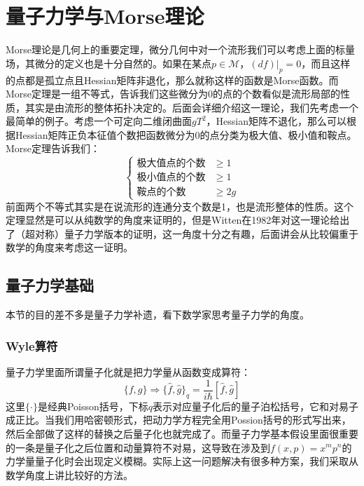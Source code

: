 \chapter{量子力学与Morse理论}
Morse理论是几何上的重要定理，微分几何中对一个流形我们可以考虑上面的标量场，其微分的定义也是十分自然的。如果在某点$p\in\mathcal{M}$，$(df)|_p=0$，而且这样的点都是孤立点且Hessian矩阵非退化，那么就称这样的函数是Morse函数。而Morse定理是一组不等式，告诉我们这些微分为0的点的个数看似是流形局部的性质，其实是由流形的整体拓扑决定的。后面会详细介绍这一理论，我们先考虑一个最简单的例子。考虑一个可定向二维闭曲面$gT^2$，Hessian矩阵不退化，那么可以根据Hessian矩阵正负本征值个数把函数微分为0的点分类为极大值、极小值和鞍点。Morse定理告诉我们：
\begin{equation}
	\begin{cases}
		\text{极大值点的个数}&\geq 1\\
		\text{极小值点的个数}&\geq 1\\
		\text{鞍点的个数}&\geq 2g
	\end{cases}
\end{equation}
前面两个不等式其实是在说流形的连通分支个数是1，也是流形整体的性质。这个定理显然是可以从纯数学的角度来证明的，但是Witten在1982年对这一理论给出了（超对称）量子力学版本的证明\cite{Witten:1982im}，这一角度十分之有趣，后面讲会从比较偏重于数学的角度来考虑这一证明。
\section{量子力学基础}
本节的目的差不多是量子力学补遗，看下数学家思考量子力学的角度。
\subsection{Wyle算符}
量子力学里面所谓量子化就是把力学量从函数变成算符：
\begin{equation}
	\{f,g\}\Rightarrow\{\hat f,\hat g\}_q=\frac{1}{i\hbar }[\hat f,\hat g]
\end{equation}
这里$\{\cdot\}$是经典Poisson括号，下标$q$表示对应量子化后的量子泊松括号，它和对易子成正比。当我们用哈密顿形式，把动力学方程完全用Possion括号的形式写出来，然后全部做了这样的替换之后量子化也就完成了。而量子力学基本假设里面很重要的一条是量子化之后位置和动量算符不对易，这导致在涉及到$f(x,p)=x^mp^n$的力学量量子化时会出现定义模糊。实际上这一问题解决有很多种方案，我们采取从数学角度上讲比较好的方法。

